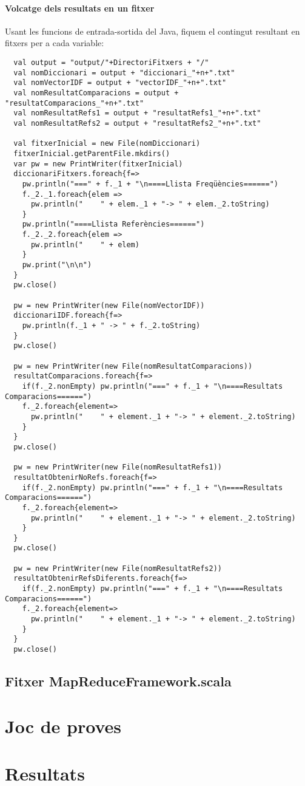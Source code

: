 \documentclass[11pt,a4paper,twoside]{report}
\begin{document}
\subsubsection{Volcatge dels resultats en un fitxer}

Usant les funcions de entrada-sortida del Java, fiquem el contingut resultant en fitxers per a cada variable:
\begin{lstlisting}
  val output = "output/"+DirectoriFitxers + "/"
  val nomDiccionari = output + "diccionari_"+n+".txt"
  val nomVectorIDF = output + "vectorIDF_"+n+".txt"
  val nomResultatComparacions = output + "resultatComparacions_"+n+".txt"
  val nomResultatRefs1 = output + "resultatRefs1_"+n+".txt"
  val nomResultatRefs2 = output + "resultatRefs2_"+n+".txt"

  val fitxerInicial = new File(nomDiccionari)
  fitxerInicial.getParentFile.mkdirs()
  var pw = new PrintWriter(fitxerInicial)
  diccionariFitxers.foreach{f=>
    pw.println("===" + f._1 + "\n====Llista Freqüències======")
    f._2._1.foreach{elem =>
      pw.println("    " + elem._1 + "-> " + elem._2.toString)
    }
    pw.println("====Llista Referències======")
    f._2._2.foreach{elem =>
      pw.println("    " + elem)
    }
    pw.print("\n\n")
  }
  pw.close()

  pw = new PrintWriter(new File(nomVectorIDF))
  diccionariIDF.foreach{f=>
    pw.println(f._1 + " -> " + f._2.toString)
  }
  pw.close()

  pw = new PrintWriter(new File(nomResultatComparacions))
  resultatComparacions.foreach{f=>
    if(f._2.nonEmpty) pw.println("===" + f._1 + "\n====Resultats Comparacions======")
    f._2.foreach{element=>
      pw.println("    " + element._1 + "-> " + element._2.toString)
    }
  }
  pw.close()

  pw = new PrintWriter(new File(nomResultatRefs1))
  resultatObtenirNoRefs.foreach{f=>
    if(f._2.nonEmpty) pw.println("===" + f._1 + "\n====Resultats Comparacions======")
    f._2.foreach{element=>
      pw.println("    " + element._1 + "-> " + element._2.toString)
    }
  }
  pw.close()

  pw = new PrintWriter(new File(nomResultatRefs2))
  resultatObtenirRefsDiferents.foreach{f=>
    if(f._2.nonEmpty) pw.println("===" + f._1 + "\n====Resultats Comparacions======")
    f._2.foreach{element=>
      pw.println("    " + element._1 + "-> " + element._2.toString)
    }
  }
  pw.close()
\end{lstlisting}





\section{Fitxer MapReduceFramework.scala}







\chapter{Joc de proves}

\chapter{Resultats}
\end{document}
